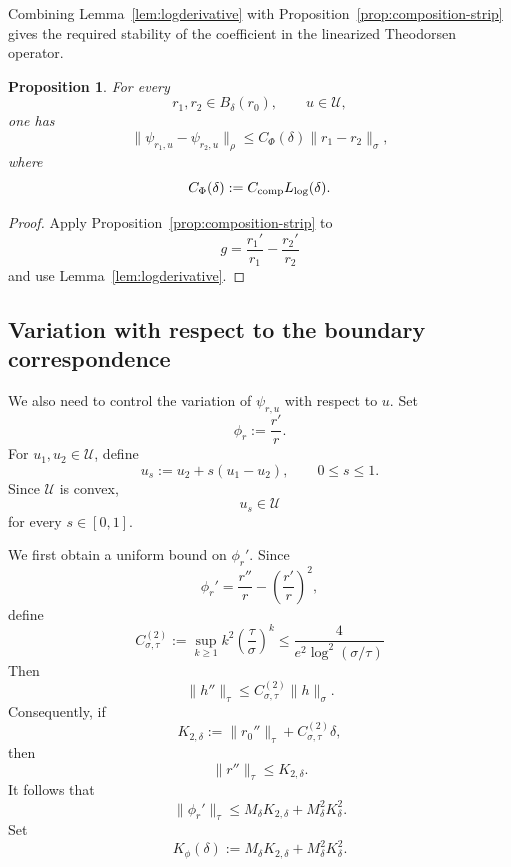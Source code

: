 \documentclass[11pt,a4paper]{amsart}
\newtheorem{proposition}[theorem]{Proposition}
\begin{document}
Combining Lemma~\ref{lem:logderivative} with
Proposition~\ref{prop:composition-strip} gives the required stability
of the coefficient in the linearized Theodorsen operator.

\begin{proposition}\label{prop:psi-r-stability}
	For every
	\[
	r_1,r_2\in B_\delta(r_0),
	\qquad
	u\in\mathcal U,
	\]
	one has
	\begin{equation}\label{eq:psi-r-stability}
		\|\psi_{r_1,u}-\psi_{r_2,u}\|_\rho
		\le
		C_\Phi(\delta)
		\|r_1-r_2\|_\sigma,
	\end{equation}
	where
	\begin{equation}\label{eq:Cphi}
		C_\Phi(\delta)
		:=
		C_{\rm comp}L_{\log}(\delta).
	\end{equation}
\end{proposition}

\begin{proof}
	Apply Proposition~\ref{prop:composition-strip} to
	\[
	g
	=
	\frac{r_1'}{r_1}
	-
	\frac{r_2'}{r_2}
	\]
	and use Lemma~\ref{lem:logderivative}.
\end{proof}


\subsection{Variation with respect to the boundary correspondence}

We also need to control the variation of $\psi_{r,u}$ with respect
to $u$. Set
\[
\phi_r:=\frac{r'}r.
\]
For $u_1,u_2\in\mathcal U$, define
\[
u_s:=u_2+s(u_1-u_2),
\qquad
0\le s\le1.
\]
Since $\mathcal U$ is convex,
\[
u_s\in\mathcal U
\]
for every $s\in[0,1]$.

We first obtain a uniform bound on $\phi_r'$. Since
\[
\phi_r'
=
\frac{r''}{r}
-
\left(\frac{r'}r\right)^2,
\]
define
\begin{equation}\label{eq:C2}
	C_{\sigma,\tau}^{(2)}:=\sup_{k\ge1}k^2\left(\frac{\tau}{\sigma}\right)^k
	\le\frac{4}{e^2\log^2(\sigma/\tau)}
\end{equation}
Then
\[
\|h''\|_\tau
\le
C_{\sigma,\tau}^{(2)}
\|h\|_\sigma.
\]
Consequently, if
\begin{equation}\label{eq:K2delta}
	K_{2,\delta}
	:=
	\|r_0''\|_\tau
	+
	C_{\sigma,\tau}^{(2)}\delta,
\end{equation}
then
\[
\|r''\|_\tau
\le
K_{2,\delta}.
\]
It follows that
\begin{equation}\label{eq:phi-prime-bound}
	\|\phi_r'\|_\tau
	\le
	M_\delta K_{2,\delta}
	+
	M_\delta^2K_\delta^2.
\end{equation}
Set
\begin{equation}\label{eq:Kphi}
	K_\phi(\delta)
	:=
	M_\delta K_{2,\delta}
	+
	M_\delta^2K_\delta^2.
\end{equation}
\end{document}
